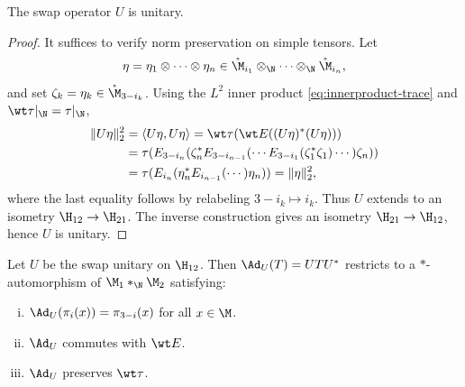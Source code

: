 \documentclass[sn-mathphys-num]{sn-jnl}
\begin{document}
\smallskip
\begin{proposition}
The swap operator $U$ is unitary.
\end{proposition}

\begin{proof}
It suffices to verify norm preservation on simple tensors.
Let
\[
\eta=\eta_1\otimes\cdots\otimes\eta_n
\in \mathring{\M}_{i_1}\otimes_{\N}\cdots\otimes_{\N}\mathring{\M}_{i_n},
\]
and set $\zeta_k=\eta_k\in\mathring{\M}_{3-i_k}$.
Using the $L^2$ inner product \cref{eq:innerproduct-trace} and $\wt\tau|_{\N}=\tau|_{\N}$,
\begin{align*}
\|U\eta\|_2^2
&=\langle U\eta,U\eta\rangle
=\wt\tau(\wt E((U\eta)^*(U\eta))) \\
&=\tau(E_{3-i_n}(\zeta_n^*
E_{3-i_{n-1}}(\cdots E_{3-i_1}(\zeta_1^*\zeta_1)\cdots)\zeta_n)) \\
&=\tau(E_{i_n}(\eta_n^*
E_{i_{n-1}}(\cdots)\eta_n))
=\|\eta\|_2^2,
\end{align*}
where the last equality follows by relabeling $3-i_k\mapsto i_k$.
Thus $U$ extends to an isometry $\H_{12}\to\H_{21}$.
The inverse construction gives an isometry $\H_{21}\to\H_{12}$, hence $U$ is unitary.
\end{proof}

\begin{proposition}\label{thm:swap}
Let $U$ be the swap unitary on $\H_{12}$.
Then $\Ad_U(T)=UTU^*$ restricts to a $*$-automorphism of $\M_1*_{\N}\M_2$ satisfying:
\begin{enumerate}[(i)]
\item $\Ad_U(\pi_i(x))=\pi_{3-i}(x)$ for all $x\in\M$.
\item $\Ad_U$ commutes with $\wt E$.
\item $\Ad_U$ preserves $\wt\tau$.
\end{enumerate}
\end{proposition}
\end{document}
